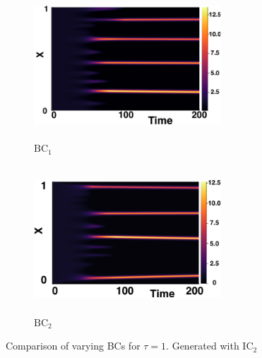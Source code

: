 \begin{figure}[H]
    \centering
    \begin{subfigure}[b]{0.45\textwidth}
        \centering
        \includegraphics[width=7cm,height=5.5cm]{ic21.png}
        \caption{$\text{BC}_1$}
        \label{}
    \end{subfigure}
    \hfill
    \begin{subfigure}[b]{0.45\textwidth}
        \centering
        \includegraphics[width=7cm,height=5.5cm]{bc1.png}
        \caption{$\text{BC}_2$}
        \label{}
    \end{subfigure}
    \caption{Comparison of varying BCs for $\tau=1$. Generated with $\text{IC}_2$}
    \label{fig:bctau2}
\end{figure}

